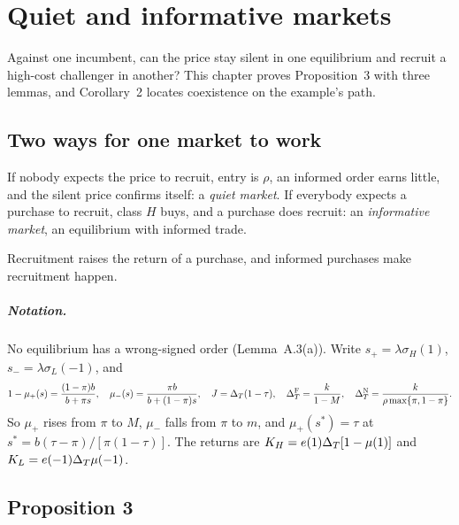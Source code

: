 \chapter{Quiet and informative markets}\label{ch:coexistence}

\begin{chapterplan}
Against one incumbent, can the price stay silent in one equilibrium and recruit a high-cost challenger in another?
This chapter proves Proposition~3 with three lemmas, and Corollary~2 locates coexistence on the example's path.
\end{chapterplan}

\section{Two ways for one market to work}\label{sec:coexistence-words}

If nobody expects the price to recruit, entry is \(\rho\), an informed order earns little, and the silent price
confirms itself: a \emph{quiet market}. If everybody expects a purchase to recruit, class \(H\) buys, and a purchase
does recruit: an \emph{informative market}, an equilibrium with informed trade.

\begin{keyidea}
Recruitment raises the return of a purchase, and informed purchases make recruitment happen.
\end{keyidea}

\paragraph{Notation.} No equilibrium has a wrong-signed order (Lemma~A.3(a)). Write \(s_+=\lambda\sigma_H(1)\),
\(s_-=\lambda\sigma_L(-1)\), and
\[
1-\mu_+(s)=\frac{(1-\pi)b}{b+\pi s},\quad \mu_-(s)=\frac{\pi b}{b+(1-\pi)s},\quad
J=\Delta_T(1-\tau),\quad \Delta_T^{\rm F}=\frac{k}{1-M},\quad \Delta_T^{\rm N}=\frac{k}{\rho\max\{\pi,1-\pi\}}.
\]
So \(\mu_+\) rises from \(\pi\) to \(M\), \(\mu_-\) falls from \(\pi\) to \(m\), and \(\mu_+(s^*)=\tau\) at
\(s^*=b(\tau-\pi)/[\pi(1-\tau)]\). The returns are \(K_H=e(1)\Delta_T[1-\mu(1)]\) and \(K_L=e(-1)\Delta_T\mu(-1)\).

\section{Proposition 3}\label{sec:coexistence-statement}

